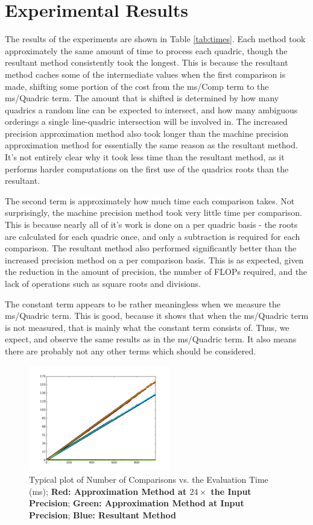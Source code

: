 \documentclass{cccg16}
\begin{document}
\section{Experimental Results}
The results of the experiments are shown in Table \ref{tab:times}.
Each method took approximately the same amount of time to process each
quadric, though the resultant method consistently took the longest.
This is because the resultant method caches some of the intermediate
values when the first comparison is made, shifting some portion of the
cost from the ms/Comp term to the ms/Quadric term.  The
amount that is shifted is determined by how many quadrics a random
line can be expected to intersect, and how many ambiguous orderings a
single line-quadric intersection will be involved in.  The increased
precision approximation method also took longer than the machine
precision approximation method for essentially the same reason as the
resultant method.  It's not entirely clear why it took less time than
the resultant method, as it performs harder computations on the first
use of the quadrics roots than the resultant.

The second term is approximately how much time each comparison takes.
Not surprisingly, the machine precision method took very little time
per comparison.  This is because nearly all of it's work is done on a
per quadric basis - the roots are calculated for each quadric once,
and only a subtraction is required for each comparison. The resultant
method also performed significantly better than the increased
precision method on a per comparison basis.  This is as expected,
given the reduction in the amount of precision, the number of FLOPs
required, and the lack of operations such as square roots and
divisions.

The constant term appears to be rather meaningless when we measure the
ms/Quadric term.  This is good, because it shows that when the
ms/Quadric term is not measured, that is mainly what the constant term
consists of.  Thus, we expect, and observe the same results as in the
ms/Quadric term.  It also means there are probably not any other terms
which should be considered.

\begin{figure}
  \includegraphics[width=0.55\textwidth]{imgs/hardEllipsoidsSingle_gentoo_adjusted.png}
  \caption{Typical plot of Number of Comparisons vs. the Evaluation
    Time (ms); {\bf Red: Approximation Method at $24\times$ the
      Input Precision}; {\bf Green: Approximation Method at Input Precision}; {\bf Blue: Resultant Method}}
  \label{fig:linefit}
\end{figure}
\end{document}
